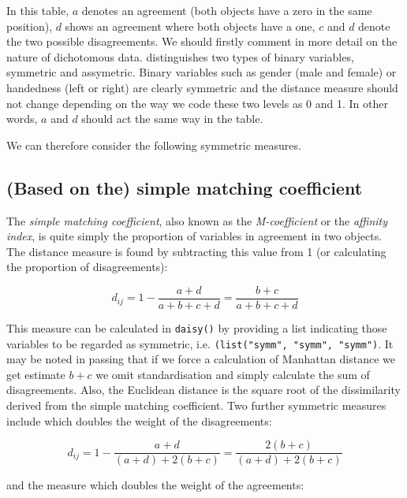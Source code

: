 In this table, $a$ denotes an agreement (both objects have a zero in the same position), $d$ shows an agreement where both objects have a one, $c$ and $d$ denote the two possible disagreements.    We should firstly comment in more detail on the nature of dichotomous data.   \cite{Gower:1971} distinguishes two types of binary variables, symmetric and assymetric.   Binary variables such as gender (male and female) or handedness (left or right) are clearly symmetric and the distance measure should not change depending on the way we code these two levels as 0 and 1.   In other words, $a$ and $d$ should act the same way in the table.   

We can therefore consider the following symmetric measures.

\subsection{(Based on the) simple matching coefficient}

The \emph{simple matching coefficient}, also known as the \emph{M-coefficient} or the \emph{affinity index}, is quite simply the proportion of variables in agreement in two objects.   The distance measure is found by subtracting this value from 1 (or calculating the proportion of disagreements):

\begin{equation}
\label{simplematch}
d_{ij} = 1 - \frac{a + d}{a + b + c + d} = \frac{b + c}{a + b + c + d}
\end{equation}

This measure can be calculated in \verb+daisy()+ by providing a list indicating those variables to be regarded as symmetric, i.e. \verb+(list("symm", "symm", "symm")+.   It may be noted in passing that if we force a calculation of Manhattan distance we get estimate $b+c$ we omit standardisation and simply calculate the sum of disagreements.   Also, the Euclidean distance is the square root of the dissimilarity derived from the simple matching coefficient.   Two further symmetric measures include \cite{Rogers+Tanimoto:1960} which doubles the weight of the disagreements:

\begin{displaymath}
d_{ij} = 1 - \frac{a + d}{(a + d) + 2(b + c)} = \frac{2(b + c)}{(a + d) + 2(b + c)}
\end{displaymath}

and the \cite{Sokal+Sneath:1963} measure which doubles the weight of the agreements:

